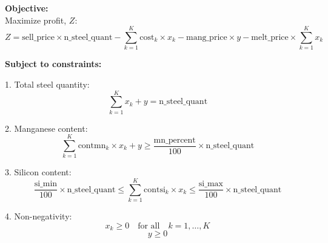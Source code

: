 \documentclass{article}
\begin{document}
\textbf{Objective:} \\
Maximize profit, \( Z \):
\[
Z = \text{sell\_price} \times \text{n\_steel\_quant} - \sum_{k=1}^{K} \text{cost}_k \times x_k - \text{mang\_price} \times y - \text{melt\_price} \times \sum_{k=1}^{K} x_k 
\]

\textbf{Subject to constraints:}

1. Total steel quantity:
\[
\sum_{k=1}^{K} x_k + y = \text{n\_steel\_quant}
\]

2. Manganese content:
\[
\sum_{k=1}^{K} \text{contmn}_k \times x_k + y \geq \frac{\text{mn\_percent}}{100} \times \text{n\_steel\_quant}
\]

3. Silicon content:
\[
\frac{\text{si\_min}}{100} \times \text{n\_steel\_quant} \leq \sum_{k=1}^{K} \text{contsi}_k \times x_k \leq \frac{\text{si\_max}}{100} \times \text{n\_steel\_quant}
\]

4. Non-negativity:
\[
x_k \geq 0 \quad \text{for all} \quad k = 1, \ldots, K
\]
\[
y \geq 0
\]
\end{document}
